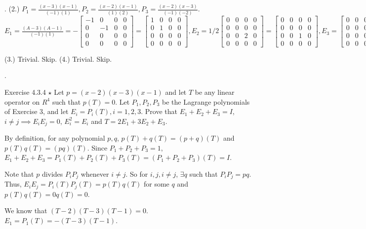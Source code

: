 \documentclass[8pt]{beamer}
\begin{document}
\begin{frame}{.}
    (2.) $P_1 = \frac{(x-3)(x-1)}{(-1)(1)}, P_2 = \frac{(x-2)(x-1)}{(1)(2)}, P_3 = \frac{(x-2)(x-3)}{(-1)(-2)}$.
    $E_1 = \frac{(A-3)(A-1)}{(-1)(1)} = -\begin{bmatrix}
    -1 & 0 & 0 & 0\\ 0 & -1 & 0 & 0 \\ 0 & 0 & 0 & 0 \\ 0 & 0 & 0 & 0
    \end{bmatrix} = \begin{bmatrix}
        1 & 0 & 0 & 0 \\ 0 & 1 & 0 & 0 \\ 0 & 0 & 0 & 0 \\ 0 & 0 & 0 & 0
    \end{bmatrix}, E_2 = 1/2 \begin{bmatrix}
       0 & 0 & 0 & 0 \\ 0 & 0 & 0 & 0 \\ 0 & 0 & 2 & 0  \\ 0 & 0 & 0 & 0
    \end{bmatrix} = \begin{bmatrix}
    0 & 0 & 0 & 0  \\ 0 & 0 & 0 & 0 \\ 0 & 0 & 1 & 0 \\ 0 & 0 & 0 & 0
    \end{bmatrix}, E_3 = \begin{bmatrix}
   0 & 0 & 0 &0 \\0 & 0 & 0 & 0 \\ 0 & 0 & 0 & 0\\ 0 & 0 & 0 & 1
    \end{bmatrix}$

    (3.) Trivial. Skip.
    (4.) Trivial. Skip.
\end{frame}

\begin{frame}{.}
    \begin{block}{Exercise 4.3.4 $\star$}
        Let $p = (x-2)(x-3)(x-1)$ and let $T$ be any linear operator on $R^4$ such that $p(T)=0$.
        Let $P_1, P_2, P_3$ be the Lagrange polynomials of Exercise $3$, and let $E_i = P_i(T), i=1,2,3$.
        Prove that $E_1 + E_2 + E_3 =I$, $i\neq j \implies E_i E_j = 0$, $E^2_i = E_i$ and $T = 2E_1 + 3E_2 + E_3$.
    \end{block}

    By definition, for any polynomial $p, q$, $p(T) + q(T) = (p+q)(T)$ and $p(T)q(T) = (pq)(T)$.
    Since $P_1 + P_2 + P_3 = 1$, $E_1 + E_2 + E_3 = P_1(T) + P_2(T) + P_3(T) = (P_1+P_2+P_3)(T) = I$.

    Note that $p$ divides $P_i P_j$ whenever $i \neq j$.
    So for $i, j, i\neq j$, $\exists q$ such that $P_i P_j = pq$.
    Thus, $E_i E_j = P_i(T) P_j(T) = p(T) q(T)$ for some $q$ and $p(T) q(T) = 0 q(T) = 0$.

    We know that $(T-2)(T-3)(T-1) = 0$.
    $E_1 = P_1(T) = -(T-3)(T-1)$.
\end{frame}
\end{document}
